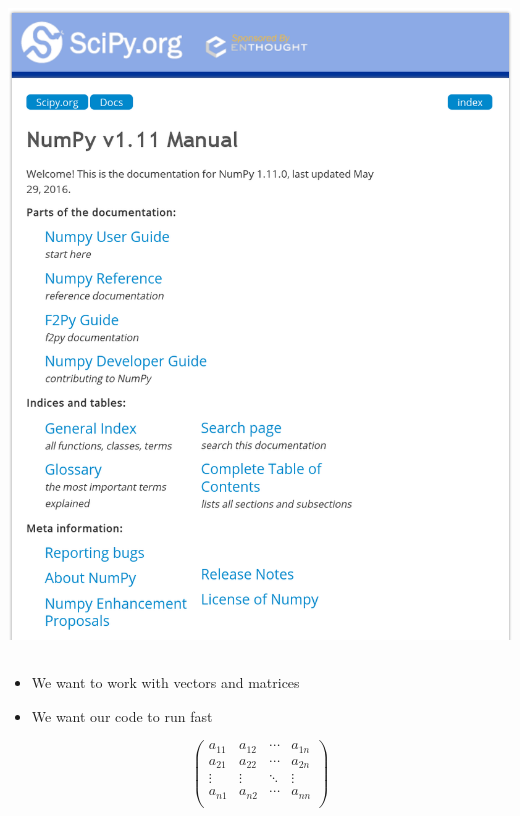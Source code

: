 \documentclass{beamer}
\begin{document}
{\begin{columns}
\begin{column}[t]{0.5\textwidth}
\begin{center}
    \vspace{0.3truecm}
    \includegraphics[width=\textwidth]{NumpyManual}
   \end{center}
  \end{column}
 \end{columns}
}

\frame
{
 \begin{itemize}
  \item We want to work with vectors and matrices
  \item We want our code to run fast
 \end{itemize}
}

\frame
{
 \begin{displaymath}
  \begin{pmatrix}
   a_{11} & a_{12} & \cdots & a_{1n}\\
   a_{21} & a_{22} & \cdots & a_{2n}\\
   \vdots & \vdots & \ddots & \vdots\\
   a_{n1} & a_{n2} & \cdots & a_{nn}\\
  \end{pmatrix}
 \end{displaymath}
}
\end{document}
